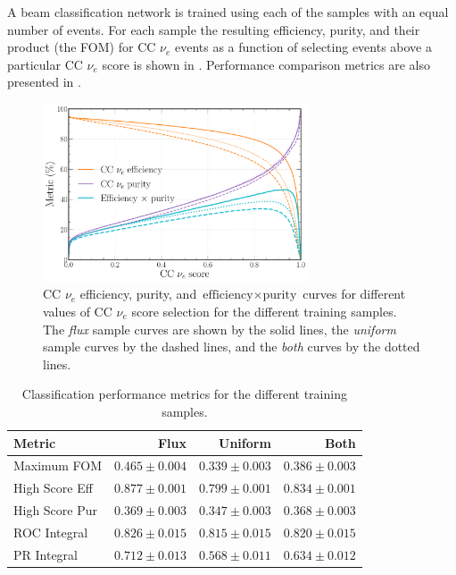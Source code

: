 A beam classification network is trained using each of the samples with an equal number of events.
For each sample the resulting efficiency, purity, and their product (the FOM) for CC $\nu_{e}$
events as a function of selecting events above a particular CC $\nu_{e}$ score is shown in
. Performance comparison metrics are also presented in
.

\begin{figure} %
    \includegraphics[width=0.7\textwidth]{diagrams/7-results/sample_nuel_eff_curves.pdf}
    \caption[CC $\nu_{e}$ efficiency and purity curves for different training samples]
    {CC $\nu_{e}$ efficiency, purity, and $\text{efficiency}\times\text{purity}$ curves for
        different values of CC $\nu_{e}$ score selection for the different training samples. The
        \emph{flux} sample curves are shown by the solid lines, the \emph{uniform} sample curves
        by the dashed lines, and the \emph{both} curves by the dotted lines.}
    \label{fig:sample_nuel_eff_curves}
\end{figure}

\begin{table} %
    \begin{tabular}{lrrr}
        Metric         & Flux           & Uniform & Both  \\
        \midrule
        Maximum FOM    & \textbf{$0.465\pm0.004$} & $0.339\pm0.003$ & $0.386\pm0.003$ \\
        High Score Eff & \textbf{$0.877\pm0.001$} & $0.799\pm0.001$ & $0.834\pm0.001$ \\
        High Score Pur & \textbf{$0.369\pm0.003$} & $0.347\pm0.003$ & $0.368\pm0.003$ \\
        ROC Integral   & \textbf{$0.826\pm0.015$} & $0.815\pm0.015$ & $0.820\pm0.015$ \\
        PR Integral    & \textbf{$0.712\pm0.013$} & $0.568\pm0.011$ & $0.634\pm0.012$ \\
    \end{tabular}
    \caption[Classification performance metrics for different training samples]
    {Classification performance metrics for the different training samples.}
    \label{tab:sample}
\end{table}


